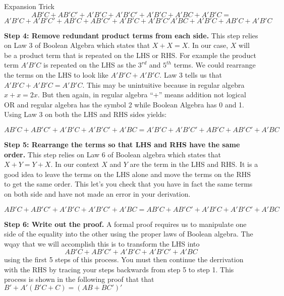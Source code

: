 \begin{process}{Expansion Trick}
$$ AB'C + AB'C' + A'B'C + A'B'C' + A'B'C + A'BC + A'B'C = $$
$$A'B'C + A'B'C' +      AB'C + AB'C' + A'B'C + A'B'C'                               A'BC + A'B'C + AB'C + A'B'C$$

\textbf{Step 4: Remove redundant product terms from each side.}
This step relies on Law 3 of Boolean Algebra which states that $X+X = X$.  In our case, $X$ will be
a product term that is repeated on the LHS or RHS.  For example the product term $A'B'C$ is repeated on the 
LHS as the $3^{rd}$ and $5^{th}$ terms.  We could rearrange the terms on the LHS to look like 
$A'B'C + A'B'C$.  Law 3 tells us that $A'B'C + A'B'C = A'B'C$. This may be unintuitive because in
regular algebra $x+x = 2x$.  But then again, in regular algebra ``+'' means addition not logical OR
and regular algebra has the symbol 2 while Boolean Algebra has 0 and 1.  Using Law 3 on both the LHS and RHS sides
yields:

$$ AB'C + AB'C' + A'B'C + A'B'C' + A'BC = A'B'C + A'B'C' +      AB'C + AB'C' + A'BC $$

\textbf{Step 5: Rearrange the terms so that LHS and RHS have the same order.}
This step relies on Law 6 of Boolean algebra which states that $X+Y = Y+X$.  In our 
context $X$ and $Y$ are the term in the LHS and RHS.  It is a good idea to leave the terms
on the LHS alone and move the terms on the RHS to get the same order.  This let's you check
that you have in fact the same terms on both side and have not made an error in your derivation.

$$ AB'C + AB'C' + A'B'C + A'B'C' + A'BC =  AB'C + AB'C' + A'B'C + A'B'C' + A'BC$$


\textbf{Step 6: Write out the proof.}
A formal proof requires us to manipulate one side of the equality into the
other using the proper laws of Boolean algebra.  The wqay that we will accomplish
this is to transform the LHS into 
$$ AB'C + AB'C' + A'B'C + A'B'C' + A'BC$$ 
using the first 5 steps of this process.  You must then continue the derrivation with
the RHS by tracing your steps backwards from step 5 to step 1.  This process is 
shown in the following proof that that $B' + A'(B'C + C) = (AB + BC')'$


\end{process}
